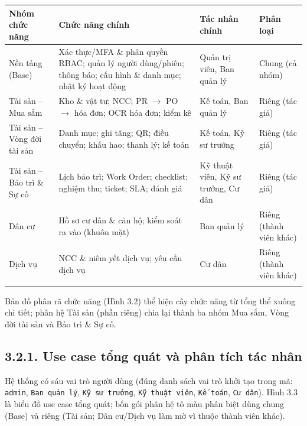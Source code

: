 {\small\singlespacing\renewcommand{\arraystretch}{1.25}
\begin{longtable}{|>{\raggedright\arraybackslash}p{3.0cm}|>{\raggedright\arraybackslash}p{7.2cm}|>{\raggedright\arraybackslash}p{2.0cm}|>{\raggedright\arraybackslash}p{2.1cm}|}
\hline
\textbf{Nhóm chức năng} & \textbf{Chức năng chính} & \textbf{Tác nhân chính} & \textbf{Phân loại} \\ \hline
\endhead
Nền tảng (Base) & Xác thực/MFA \& phân quyền RBAC; quản lý người dùng/phiên; thông báo; cấu hình \& danh mục; nhật ký hoạt động & Quản trị viên, Ban quản lý & Chung (cả nhóm) \\ \hline
Tài sản -- Mua sắm & Kho \& vật tư; NCC; PR $\rightarrow$ PO $\rightarrow$ hóa đơn; OCR hóa đơn; kiểm kê & Kế toán, Ban quản lý & Riêng (tác giả) \\ \hline
Tài sản -- Vòng đời tài sản & Danh mục; ghi tăng; QR; điều chuyển; khấu hao; thanh lý; kế toán & Kế toán, Kỹ sư trưởng & Riêng (tác giả) \\ \hline
Tài sản -- Bảo trì \& Sự cố & Lịch bảo trì; Work Order; checklist; nghiệm thu; ticket; SLA; đánh giá & Kỹ thuật viên, Kỹ sư trưởng, Cư dân & Riêng (tác giả) \\ \hline
Dân cư & Hồ sơ cư dân \& căn hộ; kiểm soát ra vào (khuôn mặt) & Ban quản lý & Riêng (thành viên khác) \\ \hline
Dịch vụ & NCC \& niêm yết dịch vụ; yêu cầu dịch vụ & Cư dân & Riêng (thành viên khác) \\ \hline
\multicolumn{4}{r}{\footnotesize\textit{Bảng 3.1. Danh sách chức năng chính của hệ thống TownHub}}
\end{longtable}}

Bản đồ phân rã chức năng (Hình 3.2) thể hiện cây chức năng từ tổng thể xuống chi tiết; phân hệ Tài sản (phần riêng) chia lại thành ba nhóm Mua sắm, Vòng đời tài sản và Bảo trì \& Sự cố.


\subsection*{3.2.1. Use case tổng quát và phân tích tác nhân}
Hệ thống có sáu vai trò người dùng (đúng danh sách vai trò khởi tạo trong mã: \texttt{admin}, \texttt{Ban quản lý}, \texttt{Kỹ sư trưởng}, \texttt{Kỹ thuật viên}, \texttt{Kế toán}, \texttt{Cư dân}). Hình 3.3 là biểu đồ use case tổng quát; bốn gói phân hệ tô màu phân biệt dùng chung (Base) và riêng (Tài sản; Dân cư/Dịch vụ làm mờ vì thuộc thành viên khác).

